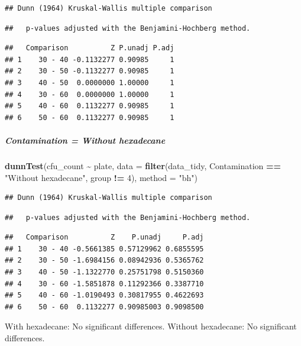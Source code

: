 \documentclass[
]{article}
\newenvironment{Shaded}{\begin{snugshade}}{\end{snugshade}}
\newcommand{\AttributeTok}[1]{\textcolor[rgb]{0.13,0.29,0.53}{#1}}
\newcommand{\DecValTok}[1]{\textcolor[rgb]{0.00,0.00,0.81}{#1}}
\newcommand{\FunctionTok}[1]{\textcolor[rgb]{0.13,0.29,0.53}{\textbf{#1}}}
\newcommand{\NormalTok}[1]{#1}
\newcommand{\SpecialCharTok}[1]{\textcolor[rgb]{0.81,0.36,0.00}{\textbf{#1}}}
\newcommand{\StringTok}[1]{\textcolor[rgb]{0.31,0.60,0.02}{#1}}
\begin{document}
\begin{verbatim}
## Dunn (1964) Kruskal-Wallis multiple comparison
\end{verbatim}

\begin{verbatim}
##   p-values adjusted with the Benjamini-Hochberg method.
\end{verbatim}

\begin{verbatim}
##   Comparison          Z P.unadj P.adj
## 1    30 - 40 -0.1132277 0.90985     1
## 2    30 - 50 -0.1132277 0.90985     1
## 3    40 - 50  0.0000000 1.00000     1
## 4    30 - 60  0.0000000 1.00000     1
## 5    40 - 60  0.1132277 0.90985     1
## 6    50 - 60  0.1132277 0.90985     1
\end{verbatim}

\subparagraph{Contamination = Without
hexadecane}\label{contamination-without-hexadecane}

\subparagraph{}\label{section-2}

\begin{Shaded}
\begin{Highlighting}[]
\FunctionTok{dunnTest}\NormalTok{(cfu\_count }\SpecialCharTok{\textasciitilde{}}\NormalTok{ plate, }\AttributeTok{data =} \FunctionTok{filter}\NormalTok{(data\_tidy, Contamination }\SpecialCharTok{==} \StringTok{"Without hexadecane"}\NormalTok{, group }\SpecialCharTok{!=} \DecValTok{4}\NormalTok{), }\AttributeTok{method =} \StringTok{"bh"}\NormalTok{)}
\end{Highlighting}
\end{Shaded}

\begin{verbatim}
## Dunn (1964) Kruskal-Wallis multiple comparison
\end{verbatim}

\begin{verbatim}
##   p-values adjusted with the Benjamini-Hochberg method.
\end{verbatim}

\begin{verbatim}
##   Comparison          Z    P.unadj     P.adj
## 1    30 - 40 -0.5661385 0.57129962 0.6855595
## 2    30 - 50 -1.6984156 0.08942936 0.5365762
## 3    40 - 50 -1.1322770 0.25751798 0.5150360
## 4    30 - 60 -1.5851878 0.11292366 0.3387710
## 5    40 - 60 -1.0190493 0.30817955 0.4622693
## 6    50 - 60  0.1132277 0.90985003 0.9098500
\end{verbatim}

With hexadecane: No significant differences. Without hexadecane: No
significant differences.
\end{document}
